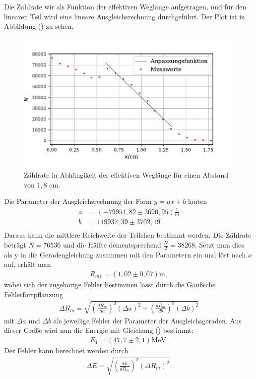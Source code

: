 \noindent Die Zählrate wir als Funktion der effektiven Weglänge aufgetragen, und für den linearen Teil wird eine lineare Ausgleichsrechnung durchgeführt.
Der Plot ist in Abbildung () zu sehen.
\begin{figure}[H]
  \centering
  \includegraphics{plot1.pdf}
  \caption{Zählrate in Abhängikeit der effektiven Weglänge für einen Abstand von $1,8$ $\si{\cm}$. }
  \label{fig:plot}
\end{figure}

\noindent Die Parameter der Ausgleichsrechnung der Form $y=ax+b$ lauten
\begin{align*}
a &=  (-79951,82 \pm 3690,95) \frac{1}{\si{\meter}}\\
b &= 119937,39 \pm 3702,19 \\
\end{align*}
Daraus kann die mittlere Reichweite der Teilchen bestimmt werden. Die Zählrate beträgt $N=76536$ und die Hälfte dementsprechend $\frac{N}{2}=38268$. Setzt man dies als y in die Geradengleichung zusammen mit den Parametern ein und löst nach $x$ auf, erhält man
\begin{align*}
R_{m1} = (1,02 \pm 0,07) \si{\meter},
\end{align*}
wobei sich der zugehörige Fehler bestimmen lässt durch die Gaußsche Fehlerfortpflanzung
\begin{align*}
\Delta R_{m} = \sqrt{(\frac{dR_m}{da})^2 (\Delta a)^2 + (\frac{dR_m}{db})^2 (\Delta b)^2}
\end{align*}
mit $\Delta a $ und $\Delta b$ als jeweilige Fehler der Parameter der Ausgleichsgeraden.
Aus dieser Größe wird nun die Energie mit Gleichung () bestimmt:
\begin{align*}
E_{1} = (47,7 \pm 2,1) \si{\MeV}.
\end{align*}
Der Fehler kann berechnet werden durch
\begin{align*}
\Delta E = \sqrt{(\frac{dE}{dR_m})^2 (\Delta R_m)^2 }.
\end{align*}


